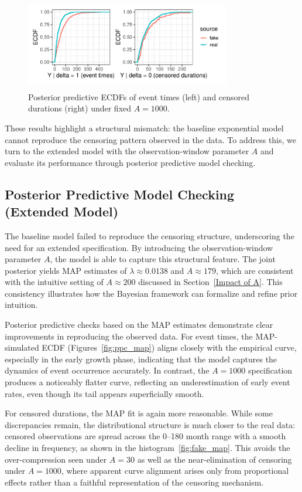 \begin{figure}[H]
    \centering
    \includegraphics[height=4cm, width=0.8\textwidth]{images/ppc_two_a1000.pdf}
    \caption{{\small Posterior predictive ECDFs of event times (left) and censored durations (right) under fixed $A=1000$.}}
    \label{fig:ppc_a1000}
\end{figure}
These results highlight a structural mismatch: the baseline exponential model cannot reproduce the censoring pattern observed in the data. To address this, we turn to the extended model with the observation-window parameter $A$ and evaluate its performance through posterior predictive model checking.


\subsection{Posterior Predictive Model Checking (Extended Model)}

The baseline model failed to reproduce the censoring structure, underscoring the need for an extended specification. By introducing the observation-window parameter $A$, the model is able to capture this structural feature. The joint posterior yields MAP estimates of $\lambda \approx 0.0138$ and $A \approx 179$, which are consistent with the intuitive setting of $A \approx 200$ discussed in Section~\ref{Impact of A}. This consistency illustrates how the Bayesian framework can formalize and refine prior intuition.

Posterior predictive checks based on the MAP estimates demonstrate clear improvements in reproducing the observed data. For event times, the MAP-simulated ECDF (Figures~\ref{fig:ppc_map}) aligns closely with the empirical curve, especially in the early growth phase, indicating that the model captures the dynamics of event occurrence accurately. In contrast, the $A=1000$ specification produces a noticeably flatter curve, reflecting an underestimation of early event rates, even though its tail appears superficially smooth.

For censored durations, the MAP fit is again more reasonable. While some discrepancies remain, the distributional structure is much closer to the real data: censored observations are spread across the 0–180 month range with a smooth decline in frequency, as shown in the histogram~\ref{fig:fake_map}. This avoids the over-compression seen under $A=30$ as well as the near-elimination of censoring under $A=1000$, where apparent curve alignment arises only from proportional effects rather than a faithful representation of the censoring mechanism.

